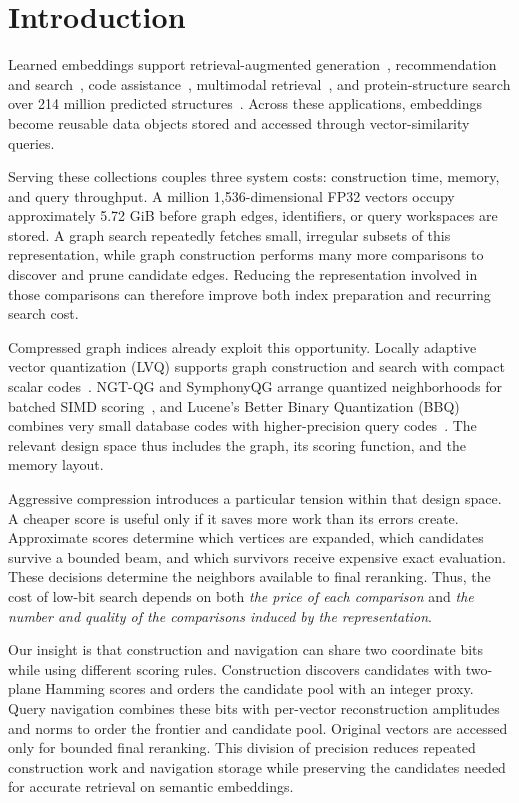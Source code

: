 \section{Introduction}
\label{sec:intro}
Learned embeddings support retrieval-augmented generation~\cite{lewis2020rag}, recommendation and search~\cite{sobot2023voyager}, code assistance~\cite{fu2025copilot}, multimodal retrieval~\cite{google2026embedding}, and protein-structure search over 214 million predicted structures~\cite{segura2026structure}. Across these applications, embeddings become reusable data objects stored and accessed through vector-similarity queries.

Serving these collections couples three system costs: construction time, memory, and query throughput. A million 1,536-dimensional FP32 vectors occupy approximately 5.72 GiB before graph edges, identifiers, or query workspaces are stored. A graph search repeatedly fetches small, irregular subsets of this representation, while graph construction performs many more comparisons to discover and prune candidate edges. Reducing the representation involved in those comparisons can therefore improve both index preparation and recurring search cost.

Compressed graph indices already exploit this opportunity. Locally adaptive vector quantization (LVQ) supports graph construction and search with compact scalar codes~\cite{aguerrebere2023lvq}. NGT-QG and SymphonyQG arrange quantized neighborhoods for batched SIMD scoring~\cite{ngt,gou2025symphony}, and Lucene's Better Binary Quantization (BBQ) combines very small database codes with higher-precision query codes~\cite{trent2024bbq,veasey2024osq}. The relevant design space thus includes the graph, its scoring function, and the memory layout.

Aggressive compression introduces a particular tension within that design space. A cheaper score is useful only if it saves more work than its errors create. Approximate scores determine which vertices are expanded, which candidates survive a bounded beam, and which survivors receive expensive exact evaluation. These decisions determine the neighbors available to final reranking. Thus, the cost of low-bit search depends on both \emph{the price of each comparison} and \emph{the number and quality of the comparisons induced by the representation}.

Our insight is that construction and navigation can share two coordinate bits while using different scoring rules. Construction discovers candidates with two-plane Hamming scores and orders the candidate pool with an integer proxy. Query navigation combines these bits with per-vector reconstruction amplitudes and norms to order the frontier and candidate pool. Original vectors are accessed only for bounded final reranking. This division of precision reduces repeated construction work and navigation storage while preserving the candidates needed for accurate retrieval on semantic embeddings.

